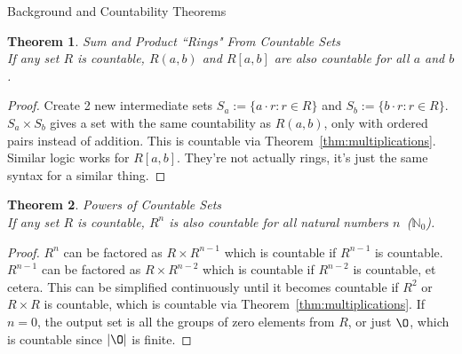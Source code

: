 \documentclass[12pt]{article}
\newtheorem{thm}{Theorem}
\begin{document}
\begin{section}{Background and Countability Theorems}
	\begin{thm}\label{thm:rings}
		\emph{Sum and Product ``Rings" From Countable Sets}\\
		\indent\emph{If any set $R$ is countable, $R(a, b)$ and $R[a, b]$ are also countable
		for all $a$ and $b$.}
	\end{thm}\begin{proof}
		Create 2 new intermediate sets $S_a := \{a\cdot r:r\in R\}$ and $S_b := \{b\cdot r:r\in R\}$.
		$S_a\times S_b$ gives a set with the same countability as $R(a,b)$, only with
		ordered pairs instead of addition. This is countable via Theorem~\ref{thm:multiplications}.
		Similar logic works for $R[a,b]$. They're not actually rings, it's just the same syntax for
		a similar thing.
	\end{proof}

	\begin{thm}\label{thm:powers}
		\emph{Powers of Countable Sets}\\
		\indent\emph{If any set $R$ is countable, $R^n$ is also countable for all natural numbers $n$
		\,($\mathbb N_0$).}
	\end{thm}\begin{proof}
		$R^n$ can be factored as $R\times R^{n-1}$ which is countable if $R^{n-1}$ is countable.
		$R^{n-1}$ can be factored as $R\times R^{n-2}$ which is countable if $R^{n-2}$ is countable,
		et cetera. This can be simplified continuously until it becomes countable if $R^2$ or
		$R\times R$ is countable, which is countable via Theorem~\ref{thm:multiplications}. If $n=0$,
		the output set is all the groups of zero elements from $R$, or just $\O$, which is countable
		since $\left|\O\right|$ is finite. 
	\end{proof}


\end{section}
\end{document}

